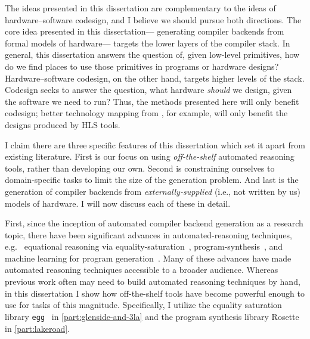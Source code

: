 The ideas presented in this dissertation
  are complementary
  to the ideas of hardware--software codesign,
  and
  I believe we should pursue both directions.
The core idea presented in
  this dissertation---%
  generating compiler backends
  from formal models of hardware---%
  targets the lower layers of the compiler stack.
In general, this dissertation answers the question of,
  given low-level primitives,
  how do we find places 
  to use those primitives 
  in programs or hardware designs?
Hardware--software codesign, on the other hand,
  targets higher levels of the stack.
Codesign seeks to answer the question,
  what hardware \textit{should} we design,
  given the software we need to run?
Thus, the methods presented here
  will only benefit codesign;
  better technology mapping from \lr, for example,
  will only benefit the designs
  produced by HLS tools.
  


I claim there are three specific features
  of this dissertation
  which set it apart from existing literature.
First is our focus on
  using
  \textit{off-the-shelf}
  automated reasoning tools,
  rather than developing our own.
Second is constraining ourselves
  to domain-specific tasks
  to limit the size of the 
  generation problem.
And last is the generation of
  compiler backends from 
  \textit{externally-supplied}
  (i.e., not written by us)
  models of hardware.
I will now discuss each of these in detail.

First, since the inception of
  automated compiler backend generation
  as a research topic,
  there have been significant
  advances in
  \gls{automated-reasoning} techniques,
  e.g.~%
  equational reasoning via \gls{equality-saturation}~\cite{tate2009equality,willsey2021egg},
  \gls{program-synthesis}~\cite{solar2008program,torlak2013growing},
  and machine learning for program generation~\cite{alon2019code2vec,austin2021program}.
Many of these advances
  have made automated reasoning techniques
  accessible to a broader audience.
Whereas previous work
  often may need to build 
  automated reasoning techniques
  by hand,
  in this dissertation I show how
  off-the-shelf tools
  have become powerful enough
  to use for tasks of this magnitude.
Specifically, I utilize
  the
  equality saturation
  library \texttt{egg}~\cite{willsey2021egg}
  in \cref{part:glenside-and-3la}
  and the program synthesis library
  Rosette~\cite{
  torlak2013growing,torlak2014lightweight}
  in \cref{part:lakeroad}.
  
